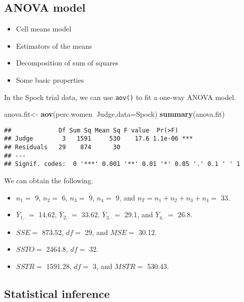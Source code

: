 \documentclass[12pt,]{book}
\newenvironment{Shaded}{\begin{snugshade}}{\end{snugshade}}
\newcommand{\KeywordTok}[1]{\textcolor[rgb]{0.13,0.29,0.53}{\textbf{#1}}}
\newcommand{\DataTypeTok}[1]{\textcolor[rgb]{0.13,0.29,0.53}{#1}}
\newcommand{\StringTok}[1]{\textcolor[rgb]{0.31,0.60,0.02}{#1}}
\newcommand{\OperatorTok}[1]{\textcolor[rgb]{0.81,0.36,0.00}{\textbf{#1}}}
\newcommand{\NormalTok}[1]{#1}
\providecommand{\tightlist}{%
  \setlength{\itemsep}{0pt}\setlength{\parskip}{0pt}}
\begin{document}
\subsection{ANOVA model}\label{anova-model}

\begin{itemize}
\tightlist
\item
  Cell means model
\item
  Estimators of the means
\item
  Decomposition of sum of squares
\item
  Some basic properties
\end{itemize}

In the Spock trial data, we can use \texttt{aov()} to fit a one-way
ANOVA model.

\begin{Shaded}
\begin{Highlighting}[]
\NormalTok{anova.fit<-}\StringTok{ }\KeywordTok{aov}\NormalTok{(perc.women}\OperatorTok{~}\NormalTok{Judge,}\DataTypeTok{data=}\NormalTok{Spock)}
\KeywordTok{summary}\NormalTok{(anova.fit)}
\end{Highlighting}
\end{Shaded}

\begin{verbatim}
##             Df Sum Sq Mean Sq F value  Pr(>F)    
## Judge        3   1591     530    17.6 1.1e-06 ***
## Residuals   29    874      30                    
## ---
## Signif. codes:  0 '***' 0.001 '**' 0.01 '*' 0.05 '.' 0.1 ' ' 1
\end{verbatim}

We can obtain the following.

\begin{itemize}
\tightlist
\item
  \(n_1=\) 9, \(n_2=\) 6, \(n_3=\) 9, \(n_4=\) 9, and
  \(n_T=n_1+n_2+n_3+n_4=\) 33.
\item
  \(\bar{Y}_{1,\cdot}=\) 14.62, \(\bar{Y}_{2,\cdot}=\) 33.62,
  \(\bar{Y}_{3,\cdot}=\) 29.1, and \(\bar{Y}_{4,\cdot}=\) 26.8.
\item
  \(SSE=\) 873.52, \(df=\) 29, and \(MSE=\) 30.12.
\item
  \(SSTO=\) 2464.8, \(df=\) 32.
\item
  \(SSTR=\) 1591.28, \(df=\) 3, and \(MSTR=\) 530.43.
\end{itemize}

\subsection{Statistical inference}\label{statistical-inference}
\end{document}
